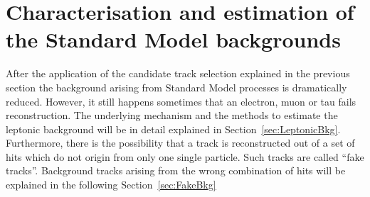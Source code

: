 \newpage
\chapter{Characterisation and estimation of the Standard Model backgrounds}
\label{sec:BackgroundEstimation}
After the application of the candidate track selection explained in the previous section the background arising from Standard Model processes is dramatically reduced.
However, it still happens sometimes that an electron, muon or tau fails reconstruction.
The underlying mechanism and the methods to estimate the leptonic background will be in detail explained in Section~\ref{sec:LeptonicBkg}.
Furthermore, there is the possibility that a track is reconstructed out of a set of hits which do not origin from only one single particle.
Such tracks are called ``fake tracks''. 
Background tracks arising from the wrong combination of hits will be explained in the following Section~\ref{sec:FakeBkg}

